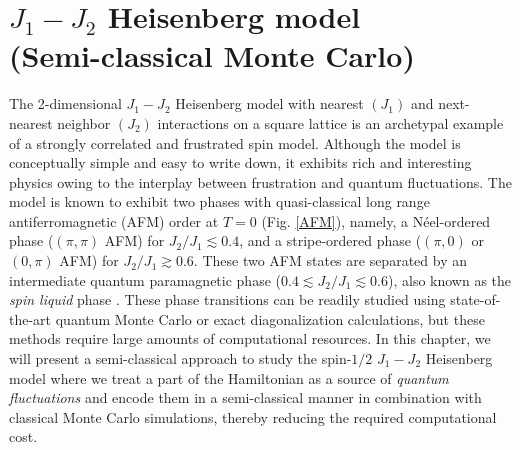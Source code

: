 \documentclass[../thesis_main.tex]{subfiles}
\begin{document}
\chapter[$J_1 - J_2$ Heisenberg model (Semi-classical Monte Carlo)]{$J_1 - J_2$ Heisenberg model $\qquad$(Semi-classical Monte Carlo)}
The 2-dimensional $J_1 - J_2$ Heisenberg model with nearest $(J_1)$ and next-nearest neighbor $(J_2)$ interactions on a square lattice is an archetypal example of a strongly correlated and frustrated spin model. Although the model is conceptually simple and easy to write down, it exhibits rich and interesting physics owing to the interplay between frustration and quantum fluctuations. The model is known to exhibit two phases with quasi-classical long range antiferromagnetic (AFM) order at $T = 0$ (Fig. \ref{AFM}), namely, a Néel-ordered phase ($(\pi,\pi)$ AFM) for $J_2/J_1 \lesssim 0.4$, and a stripe-ordered phase ($(\pi, 0)$ or $(0, \pi)$ AFM) for $J_2/J_1 \gtrsim 0.6$. These two AFM states are separated by an intermediate quantum paramagnetic phase ($0.4 \lesssim J_2/J_1 \lesssim 0.6$), also known as the \textit{spin liquid} phase \cite{Li_2014}. These phase transitions can be readily studied using state-of-the-art quantum Monte Carlo or exact diagonalization calculations, but these methods require large amounts of computational resources. In this chapter, we will present a semi-classical approach to study the spin-$1/2$ $J_1-J_2$ Heisenberg model where we treat a part of the Hamiltonian as a source of \textit{quantum fluctuations} and encode them in a semi-classical manner in combination with classical Monte Carlo simulations, thereby reducing the required computational cost.
\end{document}
